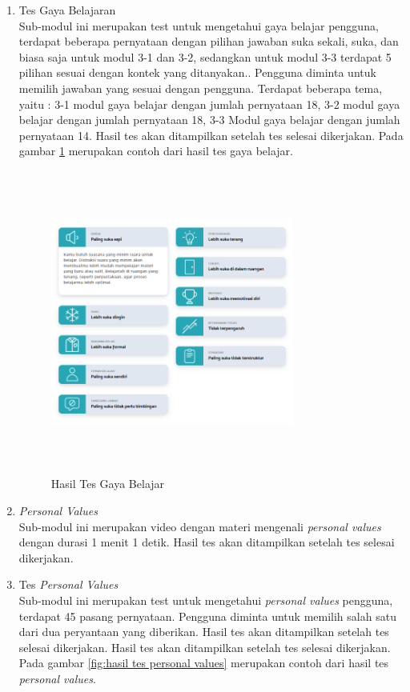\begin{enumerate}
\begin{enumerate}
        \item Tes Gaya Belajaran \\
            Sub-modul ini merupakan test untuk mengetahui gaya belajar pengguna, terdapat beberapa pernyataan dengan pilihan jawaban suka sekali, suka, dan biasa saja untuk modul 3-1 dan 3-2, sedangkan untuk modul 3-3 terdapat 5 pilihan sesuai dengan kontek yang ditanyakan.. Pengguna diminta untuk memilih jawaban yang sesuai dengan pengguna. Terdapat beberapa tema, yaitu : 3-1 modul gaya belajar dengan jumlah pernyataan 18, 3-2 modul gaya belajar dengan jumlah pernyataan 18, 3-3 Modul gaya belajar dengan jumlah pernyataan 14. Hasil tes akan ditampilkan setelah tes selesai dikerjakan. Pada gambar \ref{fig:hasil tes gaya belajar} merupakan contoh dari hasil tes gaya belajar.
            
            \begin{figure}[H]
                \centering
                \includegraphics[width = 8cm, height = 10cm]{doc/DokumenSkripsi/Gambar/gambar37.PNG}
                \caption{Hasil Tes Gaya Belajar}
                \label{fig:hasil tes gaya belajar}
            \end{figure}
            
        \item \textit{Personal Values} \\
            Sub-modul ini merupakan video dengan materi mengenali \textit{personal values} dengan durasi 1 menit 1 detik. Hasil tes akan ditampilkan setelah tes selesai dikerjakan.
            
        \item Tes \textit{Personal Values} \\
            Sub-modul ini merupakan test untuk mengetahui \textit{personal values} pengguna, terdapat 45 pasang pernyataan. Pengguna diminta untuk memilih salah satu dari dua peryantaan yang diberikan. Hasil tes akan ditampilkan setelah tes selesai dikerjakan. Hasil tes akan ditampilkan setelah tes selesai dikerjakan. Pada gambar \ref{fig:hasil tes personal values} merupakan contoh dari hasil tes \textit{personal values}. 
            

\end{enumerate}
\end{enumerate}
